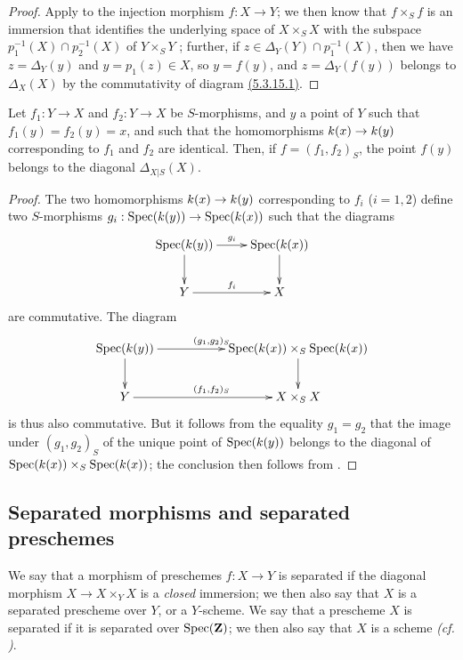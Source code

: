 \begin{proof}
\label{proof-1.5.3.16}
Apply  to the injection morphism $f:X\to Y$;
we then know that $f\times_S f$ is an immersion that identifies the underlying space of $X\times_S X$ with the subspace $p_1^{-1}(X)\cap p_2^{-1}(X)$ of $Y\times_S Y$ ;
further, if $z\in\Delta_Y(Y)\cap p_1^{-1}(X)$, then we have $z=\Delta_Y(y)$
and $y=p_1(z)\in X$, so $y=f(y)$, and $z=\Delta_Y(f(y))$ belongs to $\Delta_X(X)$ by the commutativity of diagram \hyperref[1.5.3.15]{(5.3.15.1)}.
\end{proof}

\begin{cor}[5.3.17]
\label{1.5.3.17}
Let $f_1:Y\to X$ and $f_2:Y\to X$ be $S$-morphisms, and $y$ a point of $Y$ such that $f_1(y)=f_2(y)=x$, and such that the homomorphisms $\kres(x)\to\kres(y)$ corresponding to $f_1 $ and $f_2$ are identical.
Then, if $f=(f_1,f_2)_S$, the point $f(y)$ belongs to the diagonal $\Delta_{X|S}(X)$.
\end{cor}

\begin{proof}
\label{proof-1.5.3.17}
The two homomorphisms $\kres(x)\to\kres(y)$ corresponding to $f_i$ ($i=1,2$) define two $S$-morphisms $g_i:\Spec(\kres(y))\to\Spec(\kres(x))$ such that the diagrams
\[
  \xymatrix{
    \Spec(\kres(y))\ar[r]^{g_i}\ar[d] &
    \Spec(\kres(x))\ar[d]\\
    Y\ar[r]^{f_i} &
    X
  }
\]
are commutative.
The diagram
\[
  \xymatrix{
    \Spec(\kres(y))\ar[rr]^{(g_1,g_2)_S}\ar[d] & &
    \Spec(\kres(x))\times_S\Spec(\kres(x))\ar[d]\\
    Y\ar[rr]^{(f_1,f_2)_S} & &
    X\times_S X
  }
\]
is thus also commutative.
But it follows from the equality $g_1=g_2$ that the image under $(g_1,g_2)_S$ of the unique point of ${\mathop{\mathrm{Spec}}\nolimits}(k(y))$ belongs to the diagonal of ${\mathop{\mathrm{Spec}}\nolimits}(k(x))\times_S{\mathop{\mathrm{Spec}}\nolimits}(k(x))$;
the conclusion then follows from .
\end{proof}

\subsection{Separated morphisms and separated preschemes}
\label{subsection:separated-morphism-and-separated-preschemes}

\begin{defn}[5.4.1]
\label{1.5.4.1}
We say that a morphism of preschemes $f:X\to Y$ is separated if the diagonal morphism $X\to X\times_Y X$ is a \emph{closed} immersion;
we then also say that $X$ is a separated prescheme over $Y$, or a $Y$-scheme.
We say that a prescheme $X$ is separated if it is separated over ${\mathop{\mathrm{Spec}}\nolimits}(\mathbf{Z})$;
we then also say that $X$ is a scheme \emph{(cf. )}.
\end{defn}

